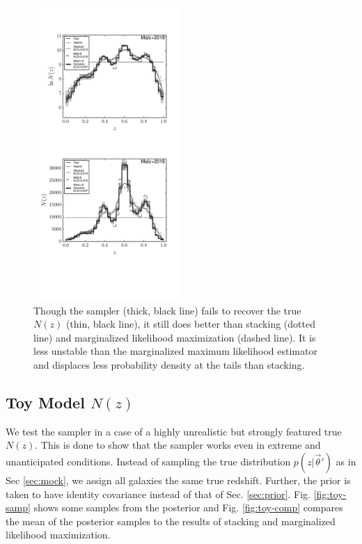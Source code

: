 \documentclass[preprint]{aastex}
\begin{document}
\begin{figure}
\includegraphics[width=0.5\textwidth]{figs/mult/comps.pdf}
\caption{Though the sampler (thick, black line) fails to recover the true 
$N(z)$ (thin, black line), it still does better than stacking (dotted line) and 
marginalized likelihood maximization (dashed line).  It is less unstable than 
the marginalized maximum likelihood estimator and displaces less probability 
density at the tails than stacking.}
\label{fig:multi-comp}
\end{figure}

\clearpage
\subsection{Toy Model $N(z)$}
\label{sec:fake}

We test the sampler in a case of a highly unrealistic but strongly featured 
true $N(z)$.  This is done to show that the sampler works even in extreme and 
unanticipated conditions.  Instead of sampling the true distribution 
$p(z|\vec{\theta}')$ as in Sec \ref{sec:mock}, we assign all galaxies the same 
true redshift.  Further, the prior is taken to have identity covariance instead 
of that of Sec. \ref{sec:prior}.  Fig. \ref{fig:toy-samp} shows some samples 
from the posterior and Fig. \ref{fig:toy-comp} compares the mean of the 
posterior samples to the results of stacking and marginalized likelihood 
maximization.
\end{document}
